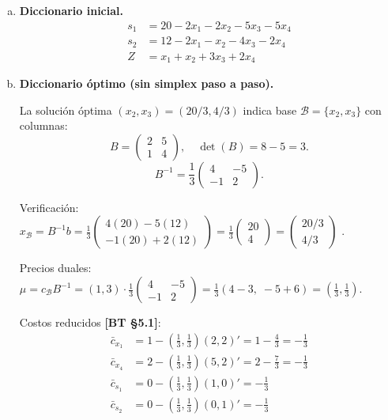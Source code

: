 \documentclass{article}
\begin{document}
\begin{enumerate}[a)]

\item \textbf{Diccionario inicial.}
\begin{align*}
s_1 &= 20 - 2x_1 - 2x_2 - 5x_3 - 5x_4 \\
s_2 &= 12 - 2x_1 - x_2 - 4x_3 - 2x_4 \\
Z   &= x_1 + x_2 + 3x_3 + 2x_4
\end{align*}

\item \textbf{Diccionario óptimo (sin simplex paso a paso).}

La solución óptima $(x_2, x_3) = (20/3, 4/3)$ indica base $\mathcal{B} = \{x_2, x_3\}$ con columnas:
\[
  B = \begin{pmatrix} 2 & 5 \\ 1 & 4 \end{pmatrix}, \quad \det(B) = 8-5 = 3.
\]
\[
  B^{-1} = \frac{1}{3}\begin{pmatrix} 4 & -5 \\ -1 & 2 \end{pmatrix}.
\]

Verificación: $x_{\mathcal{B}} = B^{-1}b = \frac{1}{3}\begin{pmatrix}4(20)-5(12)\\-1(20)+2(12)\end{pmatrix} = \frac{1}{3}\begin{pmatrix}20\\4\end{pmatrix} = \begin{pmatrix}20/3\\4/3\end{pmatrix}$ \checkmark.

Precios duales: $\mu = c_{\mathcal{B}}B^{-1} = (1,3)\cdot\frac{1}{3}\begin{pmatrix}4&-5\\-1&2\end{pmatrix} = \frac{1}{3}(4-3,\;-5+6) = \left(\frac{1}{3},\frac{1}{3}\right)$.

Costos reducidos \textbf{[BT §5.1]}:
\begin{align*}
\bar{c}_{x_1} &= 1 - \left(\tfrac{1}{3},\tfrac{1}{3}\right)(2,2)' = 1 - \tfrac{4}{3} = -\tfrac{1}{3} \\
\bar{c}_{x_4} &= 2 - \left(\tfrac{1}{3},\tfrac{1}{3}\right)(5,2)' = 2 - \tfrac{7}{3} = -\tfrac{1}{3} \\
\bar{c}_{s_1} &= 0 - \left(\tfrac{1}{3},\tfrac{1}{3}\right)(1,0)' = -\tfrac{1}{3} \\
\bar{c}_{s_2} &= 0 - \left(\tfrac{1}{3},\tfrac{1}{3}\right)(0,1)' = -\tfrac{1}{3}
\end{align*}


\end{enumerate}
\end{document}
